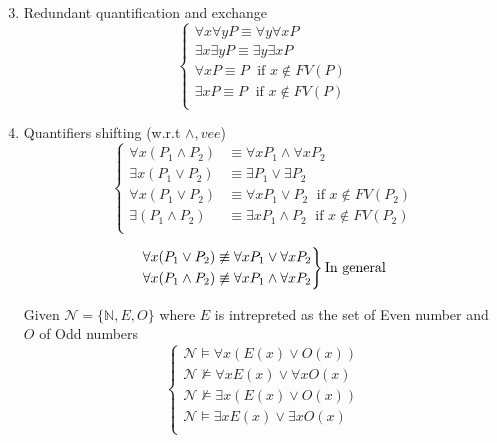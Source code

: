 \begin{enumerate}
\setcounter{enumi}{2}
\item Redundant quantification and exchange
$$
\begin{cases}
\forall x \forall y P \equiv \forall y \forall x P \\
\exists x \exists y P \equiv \exists y \exists x P \\
\forall x P \equiv P \; \text{ if }  x \notin FV(P) \\
\exists x P \equiv P \; \text{ if }  x \notin FV(P) \\
\end{cases}
$$	 

\item Quantifiers shifting (w.r.t $\wedge, vee$)
$$
\begin{cases}
	\forall x (P_1 \wedge P_2) & \equiv \forall x P_1 \wedge \forall x P_2 \\
	\exists x (P_1 \vee P_2) & \equiv \exists P_1 \vee \exists P_2 \\
	\forall x (P_1 \vee P_2) & \equiv \forall x P_1 \vee P_2 \; \text{ if } x \notin FV(P_2) \\
	\exists (P_1 \wedge P_2) & \equiv \exists x P_1 \wedge P_2 \; \text{ if } x \notin FV(P_2) \\
\end{cases}
$$

\begin{equation*}
  \begin{rcases}
	\forall x (P_1 \vee P_2) \not \equiv \forall x P_1 \vee \forall x P_2 \\
	\forall x (P_1 \wedge P_2) \not \equiv \forall x P_1 \wedge \forall x P_2 \\
  \end{rcases}
  \text{In general}
\end{equation*}

\noindent
\begin{example} Given $\mathcal{N} = \{\mathbb{N}, E, O\}$ where $E$ is intrepreted as the set of Even number and $O$ of Odd numbers
$$
\begin{cases}
	\mathcal{N} \models \forall x (E(x) \vee O(x)) \\
  \mathcal{N} \not \models \forall x E(x) \vee \forall x O(x) \\
  \mathcal{N} \not \models \exists x (E(x) \vee O(x)) \\
  \mathcal{N} \models \exists x E(x) \vee \exists x O(x) \\
\end{cases}
$$
\end{example}


\end{enumerate}
